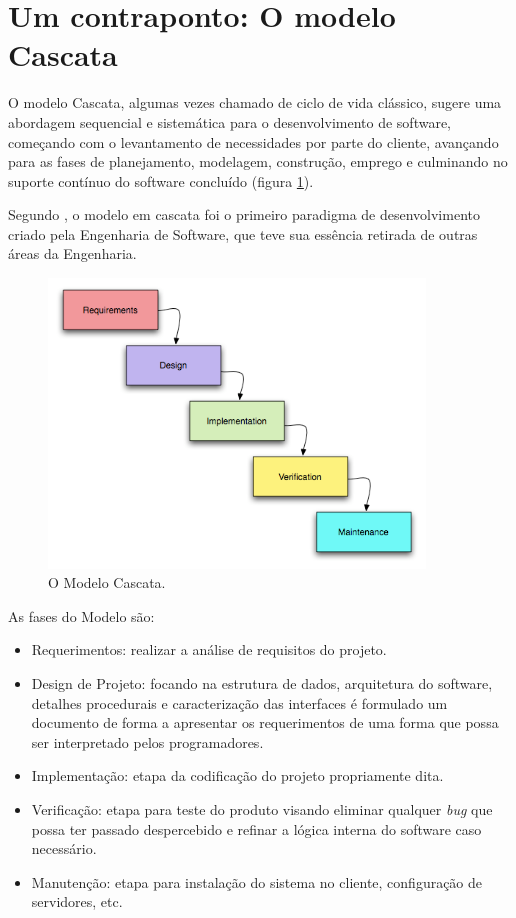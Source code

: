 \section{Um contraponto: O modelo Cascata}
    \par O modelo Cascata, algumas vezes chamado de ciclo de vida clássico, sugere uma abordagem sequencial e sistemática para o desenvolvimento de software, começando com o levantamento de necessidades por parte do cliente, avançando para as fases de planejamento, modelagem, construção, emprego e culminando no suporte contínuo do software concluído (figura \ref{fig:waterfall}). \citep{pressman:11}
    \par Segundo \cite{pressman:11}, o modelo em cascata foi o primeiro paradigma de desenvolvimento criado pela Engenharia de Software, que teve sua essência retirada de outras áreas da Engenharia.
\begin{figure}[htb]
\centering
\includegraphics[width=10cm]{figuras/waterfall}
\caption{\label{fig:waterfall}O Modelo Cascata.}
\end{figure}
	\par As fases do Modelo são:
\begin{itemize}
\item Requerimentos: realizar a análise de requisitos do projeto.
\item Design de Projeto: focando na estrutura de dados, arquitetura do software, detalhes procedurais e caracterização das interfaces é formulado um documento de forma a apresentar os requerimentos de uma forma que possa ser interpretado pelos programadores.
\item Implementação: etapa da codificação do projeto propriamente dita.
\item Verificação: etapa para teste do produto visando eliminar qualquer \emph{bug} que possa ter passado despercebido e refinar a lógica interna do software caso necessário.
\item Manutenção: etapa para instalação do sistema no cliente, configuração de servidores, etc.
\end{itemize}

